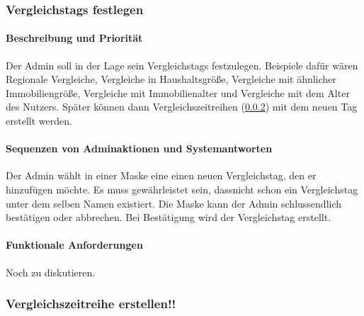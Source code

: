 \subsubsection{Vergleichstags festlegen}\label{sec:vergl_tags}
\paragraph{Beschreibung und Priorität}
Der Admin soll in der Lage sein Vergleichstags festzulegen. Beispiele dafür wären Regionale Vergleiche, Vergleiche in Haushaltsgröße, Vergleiche mit ähnlicher Immobiliengröße, Vergleiche mit Immobilienalter und Vergleiche mit dem Alter des Nutzers. Später können dann Vergleichszeitreihen (\ref{sec:vergl_zeitr}) mit dem neuen Tag erstellt werden.
\paragraph{Sequenzen von Adminaktionen und Systemantworten}
Der Admin wählt in einer Maske eine einen neuen Vergleichstag, den er hinzufügen möchte. Es muss gewährleistet sein, dassnicht schon ein Vergleichstag unter dem selben Namen existiert. Die Maske kann der Admin schlussendlich bestätigen oder abbrechen. Bei Bestätigung wird der Vergleichstag erstellt.
\paragraph{Funktionale Anforderungen}
Noch zu diskutieren.


\subsubsection{Vergleichszeitreihe erstellen!!}\label{sec:vergl_zeitr}